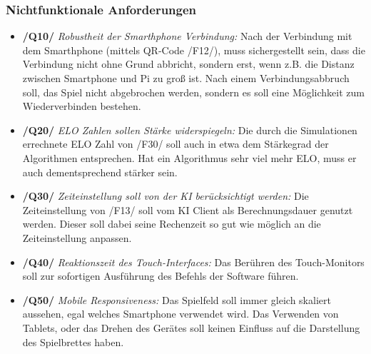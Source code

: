 \documentclass[12pt,a4paper,bibliography=totocnumbered,listof=totocnumbered]{article}
\begin{document}
\begin{appendix}
\begin{itemize}
\end{itemize}
\subsubsection{Nichtfunktionale Anforderungen}
\begin{itemize}
    \item \textbf{/Q10/} \textit{Robustheit der Smarthphone Verbindung:} Nach der Verbindung mit dem Smarthphone (mittels QR-Code /F12/), muss sichergestellt sein, dass die Verbindung nicht ohne
        Grund abbricht, sondern erst, wenn z.B. die Distanz zwischen Smartphone und Pi zu groß ist. Nach einem Verbindungsabbruch soll, 
        das Spiel nicht abgebrochen werden, sondern es soll eine Möglichkeit zum Wiederverbinden bestehen.
    \item \textbf{/Q20/} \textit{ELO Zahlen sollen Stärke widerspiegeln:} Die durch die Simulationen errechnete ELO Zahl von /F30/ soll auch in etwa dem Stärkegrad der Algorithmen entsprechen.
        Hat ein Algorithmus sehr viel mehr ELO, muss er auch dementsprechend stärker sein.
    \item \textbf{/Q30/} \textit{Zeiteinstellung soll von der KI berücksichtigt werden:} Die Zeiteinstellung von /F13/ soll vom KI Client als Berechnungsdauer genutzt werden.
        Dieser soll dabei seine Rechenzeit so gut wie möglich an die Zeiteinstellung anpassen.
    \item \textbf{/Q40/} \textit{Reaktionszeit des Touch-Interfaces:} Das Berühren des Touch-Monitors soll zur sofortigen Ausführung des Befehls der Software führen.
    \item \textbf{/Q50/} \textit{Mobile Responsiveness:} Das Spielfeld soll immer gleich skaliert aussehen, egal welches Smartphone verwendet wird. 
        Das Verwenden von Tablets, oder das Drehen des Gerätes soll keinen Einfluss auf die Darstellung des Spielbrettes haben.
\end{itemize}

\end{appendix}
\end{document}
